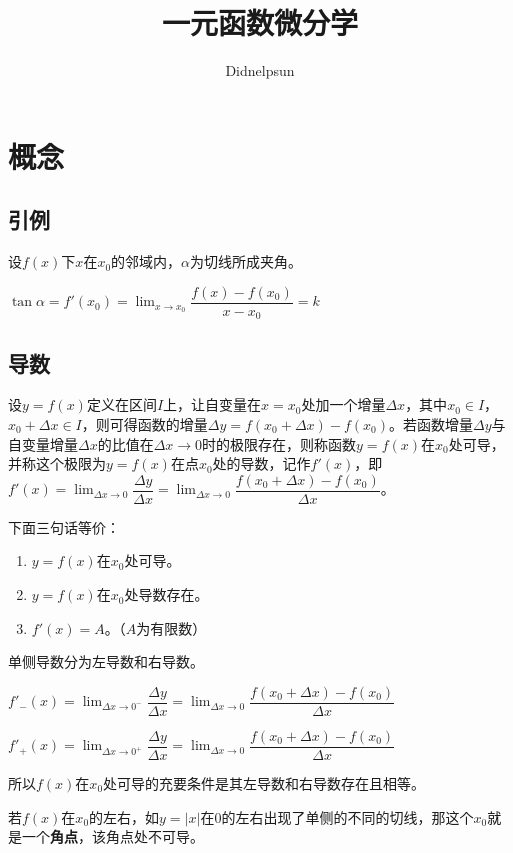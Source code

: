 \documentclass[UTF8, 12pt]{ctexart}
\author{Didnelpsun}
\title{一元函数微分学}
\date{}
\begin{document}
\renewcommand{\arraystretch}{1.5}
\maketitle
\thispagestyle{empty}
\tableofcontents
\thispagestyle{empty}
\newpage
\pagestyle{plain}
\setcounter{page}{1}
\section{概念}
\subsection{引例}

设$f(x)$下$x$在$x_0$的邻域内，$\alpha$为切线所成夹角。

$\tan\alpha=f'(x_0)=\lim_{x\to x_0}\dfrac{f(x)-f(x_0)}{x-x_0}=k$

\subsection{导数}

设$y=f(x)$定义在区间$I$上，让自变量在$x=x_0$处加一个增量$\Delta x$，其中$x_0\in I$，$x_0+\Delta x\in I$，则可得函数的增量$\Delta y=f(x_0+\Delta x)-f(x_0)$。若函数增量$\Delta y$与自变量增量$\Delta x$的比值在$\Delta x\to 0$时的极限存在，则称函数$y=f(x)$在$x_0$处可导，并称这个极限为$y=f(x)$在点$x_0$处的导数，记作$f'(x)$，即$f'(x)=\lim_{\Delta x\to 0}\dfrac{\Delta y}{\Delta x}=\lim_{\Delta x\to 0}\dfrac{f(x_0+\Delta x)-f(x_0)}{\Delta x}$。

下面三句话等价：

\begin{enumerate}
    \item $y=f(x)$在$x_0$处可导。
    \item $y=f(x)$在$x_0$处导数存在。
    \item $f'(x)=A$。（$A$为有限数）
\end{enumerate}

单侧导数分为左导数和右导数。

$f'_-(x)=\lim_{\Delta x\to 0^-}\dfrac{\Delta y}{\Delta x}=\lim_{\Delta x\to 0}\dfrac{f(x_0+\Delta x)-f(x_0)}{\Delta x}$

$f'_+(x)=\lim_{\Delta x\to 0^+}\dfrac{\Delta y}{\Delta x}=\lim_{\Delta x\to 0}\dfrac{f(x_0+\Delta x)-f(x_0)}{\Delta x}$

所以$f(x)$在$x_0$处可导的充要条件是其左导数和右导数存在且相等。

若$f(x)$在$x_0$的左右，如$y=\vert x\vert$在$0$的左右出现了单侧的不同的切线，那这个$x_0$就是一个\textbf{角点}，该角点处不可导。
\end{document}
